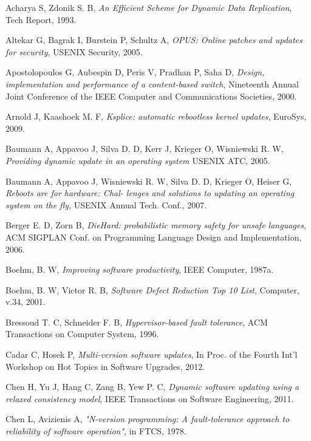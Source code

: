 \documentclass[a4paper,11pt,twoside]{report}
\begin{document}
\begin{thebibliography}{1}
 Acharya S, Zdonik S. B, {\em An Efficient Scheme for Dynamic Data Replication}, Tech Report, 1993.

 Altekar G, Bagrak I, Burstein P, Schultz A, {\em OPUS: Online patches and updates for security}, USENIX Security, 2005.


Apostolopoulos G, Aubespin D, Peris V, Pradhan P, Saha D, {\em Design, implementation and performance of a content-based switch}, Nineteenth Annual Joint Conference of the IEEE Computer and Communications Societies, 2000.

 Arnold J, Kaashoek M. F, {\em Ksplice: automatic rebootless kernel updates}, EuroSys, 2009.

   Baumann A, Appavoo J, Silva D. D, Kerr J, Krieger O, Wisniewski R. W, {\em Providing dynamic update in an operating system} USENIX ATC, 2005. 

 Baumann A, Appavoo J, Wisniewski R. W, Silva D. D, Krieger O, Heiser G, {\em Reboots are for hardware: Chal- lenges and solutions to updating an operating system on the fly}, USENIX Annual Tech. Conf., 2007. 

 Berger E. D, Zorn B, {\em DieHard: probabilistic memory safety for unsafe languages}, ACM SIGPLAN Conf. on Programming Language Design and Implementation, 2006.

Boehm, B. W, \textit{Improving software productivity}, IEEE Computer, 1987a.

Boehm, B. W, Victor R. B, \textit{Software Defect Reduction Top 10 List}, Computer, v.34, 2001.

 Bressoud T. C, Schneider F. B, {\em Hypervisor-based fault tolerance}, ACM Transactions on Computer System, 1996.

 Cadar C, Hosek P, {\em Multi-version software updates}, In Proc. of the Fourth Int'l Workshop on Hot Topics in Software Upgrades, 2012.

Chen H, Yu J, Hang C, Zang B, Yew P. C, {\em Dynamic software updating using a relaxed consistency model}, IEEE Transactions on Software Engineering, 2011.

Chen L, Avizienis A, {\em  "N-version programming: A fault-tolerance approach to reliability of software operation"}, in FTCS, 1978.
 

\end{thebibliography}
\end{document}
